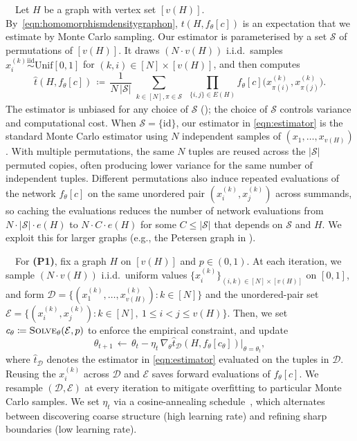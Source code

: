 \documentclass{article}
\theoremstyle{plain}
\theoremstyle{definition}
\theoremstyle{remark}
\begin{document}
\ $\,$
Let $H$ be a graph with vertex set $[v(H)]$. By~\eqref{eqn:homomorphismdensitygraphon}, $t(H, f_\theta[c])$ is an expectation that we estimate by Monte Carlo sampling. Our estimator is parameterised by a set $\mathcal{S}$ of permutations of $[v(H)]$. It draws $(N \cdot v(H))$ i.i.d.\ samples $x_i^{(k)} \stackrel{\mathrm{iid}}{\sim} \mathrm{Unif}[0,1]$ for $(k, i) \in [N] \times [v(H)]$, and then computes
\begin{equation}
\label{eqn:estimator}
  \widehat{t}(H, f_\theta[c])
  \,\coloneqq\,
  \frac{1}{N \, |\mathcal{S}|}
  \sum_{\substack{k \in [N], \pi \in \mathcal{S}}}\,
  \prod_{\{i, j\} \in E(H)}
  f_\theta[c]\bigl(x_{\pi(i)}^{(k)}, x_{\pi(j)}^{(k)}\bigr).
\end{equation}
The estimator is unbiased for any choice of $\mathcal{S}$ (); the choice of $\mathcal{S}$ controls variance and computational cost.
When $\mathcal{S} = \{\mathrm{id}\}$, our estimator in \eqref{eqn:estimator} is the standard Monte Carlo estimator using $N$ independent samples of $(x_1, \ldots, x_{v(H)})$. With multiple permutations, the same $N$ tuples are reused across the $|\mathcal{S}|$ permuted copies, often producing lower variance for the same number of independent tuples.
Different permutations also induce repeated evaluations of the network $f_\theta[c]$ on the same unordered pair $(x_i^{(k)}, x_j^{(k)})$ across summands, so caching the evaluations reduces the number of network evaluations from $N \cdot |\mathcal{S}| \cdot e(H)$ to $N \cdot C \cdot e(H)$ for some $C \le |\mathcal{S}|$ that depends on $\mathcal{S}$ and $H$. We exploit this for larger graphs (e.g., the Petersen graph in ).

\ $\,$
For \textbf{(P1)}, fix a graph $H$ on $[v(H)]$ and $p \in (0, 1)$. At each iteration, we sample $(N \cdot v(H))$ i.i.d.\ uniform values $\{x_i^{(k)}\}_{(i,k) \in [N] \times [v(H)]}$ on $[0, 1]$, and form
$\mathcal{D} = \{(x_1^{(k)}, \ldots, x_{v(H)}^{(k)}) : k \in [N]\}$ and the unordered-pair set $\mathcal{E} = \{(x^{(k)}_i, x^{(k)}_j) : k \in [N],\ 1 \le i < j \le v(H)\}$. Then, we set $c_\theta \coloneqq \textsc{Solve}_\theta(\mathcal{E}, p)$ to enforce the empirical constraint, and update
\[
\theta_{t+1} \,\leftarrow\, \theta_t - \eta_t\, \nabla_\theta \widehat{t}_{\mathcal{D}}(H, f_\theta[c_\theta])\big|_{\theta = \theta_t},
\]
where $\widehat{t}_{\mathcal{D}}$ denotes the estimator in \eqref{eqn:estimator} evaluated on the tuples in $\mathcal{D}$. Reusing the $x_i^{(k)}$ across $\mathcal{D}$ and $\mathcal{E}$ saves forward evaluations of $f_\theta[c]$. We resample $(\mathcal{D}, \mathcal{E})$ at every iteration to mitigate overfitting to particular Monte Carlo samples.
We set $\eta_t$ via a cosine-annealing schedule~\citep{loshchilov2017sgdr}, which alternates between discovering coarse structure (high learning rate) and refining sharp boundaries (low learning rate). 
\end{document}
